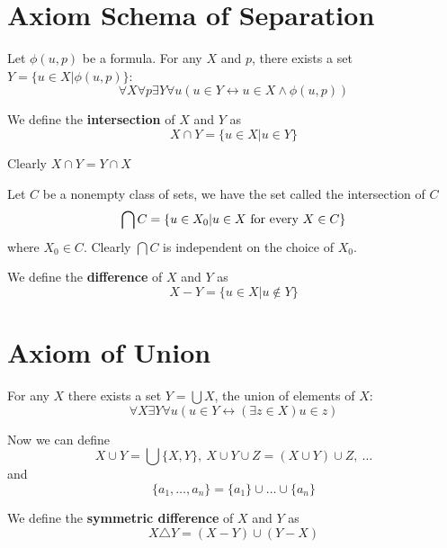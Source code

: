 \documentclass[12pt]{book}
\begin{document}
\section{Axiom Schema of Separation}
\begin{axiom}
	Let $\phi(u,p)$ be a formula. For any $X$ and $p$, there exists a set $Y=\{u\in X|\phi(u,p)\}$:
	\begin{equation}
		\forall X\forall p\exists Y\forall u(u\in Y\leftrightarrow u\in X\wedge \phi(u,p) )
	\end{equation}
\end{axiom}
\begin{definition}
	We define the {\bf intersection} of $X$ and $Y$ as
	\begin{equation}
		X\cap Y=\{u\in X|u\in Y\}
	\end{equation}
	
	Clearly $X\cap Y=Y\cap X$
\end{definition}
\begin{definition}
	Let $C$ be a nonempty class of sets, we have the set called the intersection of $C$
	\begin{equation}
		\bigcap C=\{u\in X_0|u\in X {\rm\ for\ every\ } X\in C\}
	\end{equation}
	where $X_0\in C$. Clearly $\bigcap C$ is independent on the choice of $X_0$.
\end{definition}
\begin{definition}
	We define the {\bf difference} of $X$ and $Y$ as
	\begin{equation}
		X- Y=\{u\in X|u\not\in Y\}
	\end{equation}
\end{definition}
\section{Axiom of Union}
\begin{axiom}
	For any $X$ there exists a set $Y=\bigcup X$, the union of elements of $X$:
	\begin{equation}
		\forall X \exists Y\forall u (u\in Y\leftrightarrow (\exists z\in X) u\in z)
	\end{equation}
\end{axiom}
Now we can define 
\begin{equation}
	X\cup Y=\bigcup\{X,Y\},\ X\cup Y\cup Z=(X\cup Y)\cup Z,\ \dots
\end{equation}
and
\begin{equation}
	\{a_1,\dots,a_n\}=\{a_1\}\cup\dots\cup\{a_n\}
\end{equation}
\begin{definition}
	We define the {\bf symmetric difference} of $X$ and $Y$ as
	\begin{equation}
		X\triangle Y=(X-Y)\cup(Y-X)
	\end{equation}
\end{definition}
\end{document}
